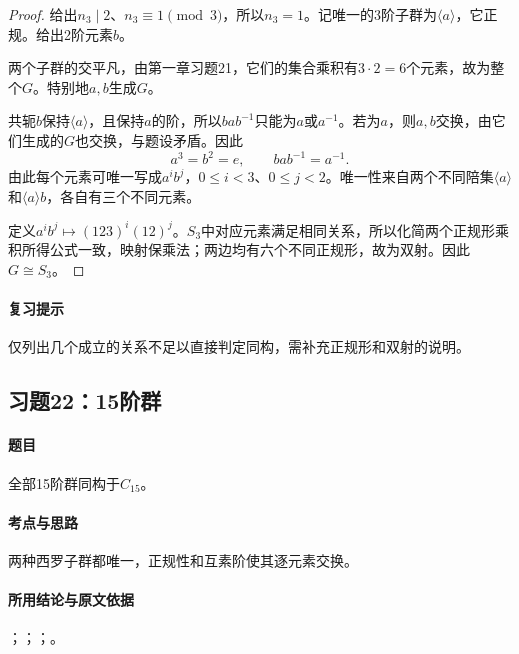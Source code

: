 
\begin{proof}
给出$n_3\mid2$、$n_3\equiv1\pmod3$，所以$n_3=1$。记唯一的3阶子群为$\langle a\rangle$，它正规。给出2阶元素$b$。

两个子群的交平凡，由第一章习题21，它们的集合乘积有$3\cdot2=6$个元素，故为整个$G$。特别地$a,b$生成$G$。

共轭$b$保持$\langle a\rangle$，且保持$a$的阶，所以$bab^{-1}$只能为$a$或$a^{-1}$。若为$a$，则$a,b$交换，由它们生成的$G$也交换，与题设矛盾。因此
\[
a^3=b^2=e,\qquad bab^{-1}=a^{-1}.
\]
由此每个元素可唯一写成$a^ib^j$，$0\leq i<3$、$0\leq j<2$。唯一性来自两个不同陪集$\langle a\rangle$和$\langle a\rangle b$，各自有三个不同元素。

定义$a^ib^j\mapsto(123)^i(12)^j$。$S_3$中对应元素满足相同关系，所以化简两个正规形乘积所得公式一致，映射保乘法；两边均有六个不同正规形，故为双射。因此$G\cong S_3$。
\end{proof}

\paragraph{复习提示}
仅列出几个成立的关系不足以直接判定同构，需补充正规形和双射的说明。


\subsection{习题22：\texorpdfstring{15阶群}{15阶群}}
\label{ex:2:22}

\paragraph{题目}
全部15阶群同构于$C_{15}$。

\paragraph{考点与思路}
两种西罗子群都唯一，正规性和互素阶使其逐元素交换。

\paragraph{所用结论与原文依据}
；；；。


